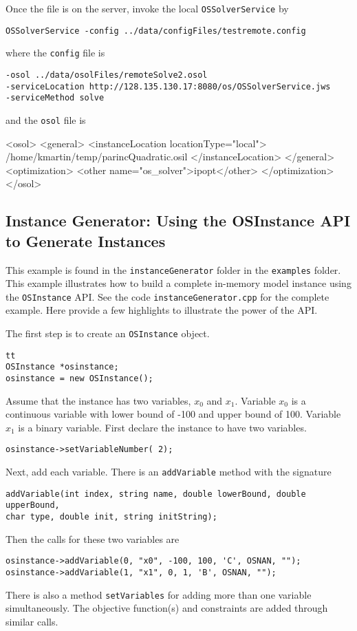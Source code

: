 \documentclass[11pt]{article}
\renewcommand{\_}{{\char"5F}}
\renewcommand{\{}{{\char"7B}}
\renewcommand{\}}{{\char"7D}}
\renewcommand{\^}{{\char"0D}}
\renewcommand{\'}{{\char"0D}}
\begin{document}
Once the file is on the server, invoke the local {\tt OSSolverService} by
\begin{verbatim}
OSSolverService -config ../data/configFiles/testremote.config
\end{verbatim}
where the {\tt config} file is
\begin{verbatim}
-osol ../data/osolFiles/remoteSolve2.osol
-serviceLocation http://128.135.130.17:8080/os/OSSolverService.jws
-serviceMethod solve
\end{verbatim}
and the {\tt osol} file is
\begin{verbatimtab}[5]
<osol>
    <general>
         <instanceLocation locationType="local">
         	/home/kmartin/temp/parincQuadratic.osil
         </instanceLocation>  
    </general>
    <optimization>
    	<other name="os_solver">ipopt</other>
    </optimization>
</osol>
\end{verbatimtab}


\subsection{Instance Generator: Using the OSInstance API to Generate Instances}\label{subsection:exampleOSInstanceGeneration}

This example is found in the {\tt instanceGenerator} folder in the {\tt examples} folder.  This example illustrates how to build a complete in-memory model instance using the {\tt OSInstance} API.   See the code {\tt instanceGenerator.cpp} for the complete example. Here provide a few highlights to illustrate the power of the API. 

The first step is to create an {\tt OSInstance} object.
\begin{verbatim}tt
OSInstance *osinstance;
osinstance = new OSInstance();
\end{verbatim}

Assume that the instance has two variables, $x_{0}$ and $x_{1}.$ Variable $x_{0}$ is a continuous variable with lower bound of -100 and upper bound of 100. Variable $x_{1}$ is a binary variable. First declare the instance to have two variables.
\begin{verbatim}
osinstance->setVariableNumber( 2);
\end{verbatim}
Next, add each variable. There is an {\tt addVariable} method with the signature
\begin{verbatim}
addVariable(int index, string name, double lowerBound, double upperBound, 
char type, double init, string initString);
\end{verbatim}
Then the calls for these two variables are
\begin{verbatim}
osinstance->addVariable(0, "x0", -100, 100, 'C', OSNAN, "");
osinstance->addVariable(1, "x1", 0, 1, 'B', OSNAN, "");
\end{verbatim}
There is also a method {\tt setVariables} for adding more than one variable simultaneously.  The objective function(s) and constraints are added through similar calls. 
\end{document}
